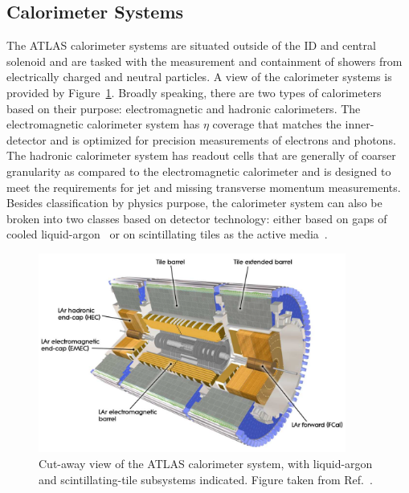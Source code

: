 \subsection{Calorimeter Systems}
\label{sec:calorimeters}

The ATLAS calorimeter systems are situated outside of the ID and central solenoid and
are tasked with the measurement and containment of showers from electrically charged and neutral particles.
A view of the calorimeter systems is provided by Figure~\ref{fig:atlas_calorimeters_cutaway}.
Broadly speaking, there are two types of calorimeters based on their purpose:
electromagnetic and hadronic calorimeters.
The electromagnetic calorimeter system has $\eta$ coverage that matches the inner-detector
and is optimized for precision measurements of electrons and photons.
The hadronic calorimeter system has readout cells that are generally of
coarser granularity as compared to the electromagnetic calorimeter and
is designed to meet the requirements for jet and missing transverse momentum
measurements.
Besides classification by physics purpose, the calorimeter system can also
be broken into two classes based on detector technology: either based
on gaps of cooled liquid-argon~\cite{CERN-LHCC-96-041} or on scintillating tiles as the active media~\cite{CERN-LHCC-96-042}.

\begin{figure}[!htb]
    \begin{center}
        \includegraphics[width=0.9\textwidth]{figures/chapter2/calorimeters/atlas_calorimeter_cutaway}
        \caption{
            Cut-away view of the ATLAS calorimeter system, with liquid-argon and scintillating-tile
            subsystems indicated.
            Figure taken from Ref.~\cite{ATLASCollab}.
        }
        \label{fig:atlas_calorimeters_cutaway}
    \end{center}
\end{figure}

